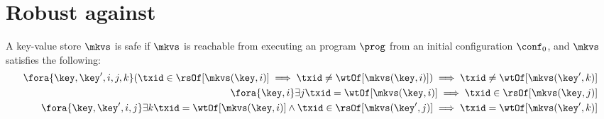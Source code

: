 \section{Robust against \WSI}
\begin{definition}
    \label{def:wsi-safe}
    A key-value store \( \mkvs \) is \WSI safe if \( \mkvs \) is 
    reachable from executing an program \( \prog \) from an initial configuration \( \conf_0 \),
    and \( \mkvs \) satisfies the following:
    \begin{align}
         \fora{\key, \key',i,j,k} ( \txid \in \rsOf[\mkvs(\key,i)] \implies \txid \neq \wtOf[\mkvs(\key,i)] ) \implies \txid \neq \wtOf[\mkvs(\key',k)] \label{equ:wsi-safe-read-only} \\
         \fora{\key,i} \exists{j} \txid = \wtOf[\mkvs(\key,i)] \implies \txid \in \rsOf[\mkvs(\key,j)] \label{equ:wsi-safe-write-must-read} \\
         \fora{\key,\key',i, j} \exists{k} \txid = \wtOf[\mkvs(\key,i)] \land \txid \in \rsOf[\mkvs(\key',j)] \implies \txid = \wtOf[\mkvs(\key',k)] \label{equ:wsi-safe-all-write}
    \end{align}
\end{definition}


